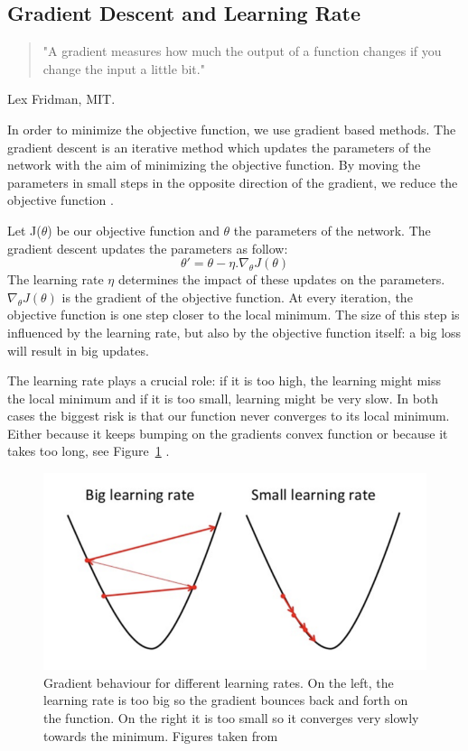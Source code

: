 \subsection{Gradient Descent and Learning Rate} \label{sec:grad_lr}
 \begin{quote}
     "A gradient measures how much the output of a function changes if you change the input a little bit."
 \end{quote} Lex Fridman, MIT. 


In order to minimize the objective function, we use gradient based methods. The gradient descent is an iterative method which updates the parameters of the network with the aim of minimizing the objective function. By moving the parameters in small steps in the opposite direction of the gradient, we reduce the objective function \cite{cs231n}. 

Let J(\(\theta\)) be our objective function and \(\theta\) the parameters of the network. The gradient descent updates the parameters as follow: 
\begin{equation}
    \theta' = \theta - \eta . \nabla_\theta J(\theta)
\end{equation} The learning rate \(\eta\) determines the impact of these updates on the parameters. \(\nabla_\theta J(\theta) \) is the gradient of the objective function. At every iteration, the objective function is one step closer to the local minimum. The size of this step is influenced by the learning rate, but also by the objective function itself: a big loss will result in big updates. 


The learning rate plays a crucial role: if it is too high, the learning might miss the local minimum and if it is too small, learning might be very slow. In both cases the biggest risk is that our function never converges to its local minimum. Either because it keeps bumping on the gradients convex function or because it takes too long, see Figure~\ref{fig:LR}  \cite{cs231n}.  
\begin{figure}[!htp]
    \centering
        \includegraphics[width=1\textwidth]{figures/02-LR}
        \caption[Gradient behaviour for different learning rates]{Gradient behaviour for different learning rates. On the left, the learning rate is too big so the gradient bounces back and forth on the function. On the right it is too small so it converges very slowly towards the minimum. Figures taken from \cite{gradient} }
        \label{fig:LR}
\end{figure}

